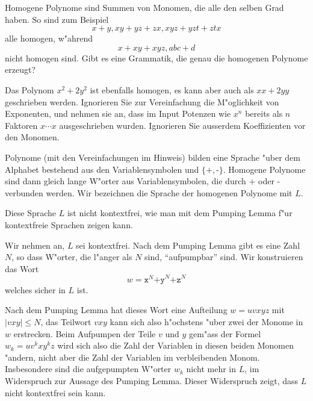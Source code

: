 Homogene Polynome sind Summen von Monomen, die alle den selben Grad haben.
So sind zum Beispiel 
\[
x+y, xy+yz+zx, xyz+yzt+ztx
\]
alle homogen, w"ahrend
\[
x+xy+xyz, abc+d
\]
nicht homogen sind. Gibt es eine Grammatik, die genau die homogenen Polynome
erzeugt?

\begin{hinweis}
Das Polynom $x^2+2y^2$ ist ebenfalls homogen, es kann aber auch als $xx+2yy$
geschrieben werden. 
Ignorieren Sie zur Vereinfachung die M"oglichkeit von Exponenten,
und nehmen sie an, dass im Input Potenzen wie $x^n$ bereits als
$n$ Faktoren $x\cdots x$ ausgeschrieben wurden.
Ignorieren Sie ausserdem Koeffizienten vor den Monomen.
\end{hinweis}

\begin{loesung}
Polynome (mit den Vereinfachungen im Hinweis) bilden eine Sprache
"uber dem Alphabet bestehend aus
den Variablensymbolen und $\{\texttt{+},\texttt{-}\}$.
Homogene Polynome sind
dann gleich lange W"orter aus Variablensymbolen, die durch
$\texttt{+}$ oder $\texttt{-}$ verbunden werden. Wir bezeichnen die
Sprache der homogenen Polynome mit $L$.

Diese Sprache $L$ ist nicht kontextfrei, wie man mit dem Pumping Lemma
f"ur kontextfreie Sprachen zeigen kann.

Wir nehmen an, $L$ sei kontextfrei. Nach dem Pumping Lemma
gibt es eine Zahl $N$, so dass W"orter, die l"anger als $N$ sind,
``aufpumpbar'' sind. Wir konstruieren das Wort
\[
w=\texttt{x}^N\texttt{+y}^N\texttt{+z}^N
\]
welches sicher in $L$ ist.

Nach dem Pumping Lemma hat dieses Wort eine Aufteilung
$w=uvxyz$ mit $|vxy|\le N$, das Teilwort $vxy$ kann sich also 
h"ochstens "uber zwei der Monome in $w$ erstrecken.
Beim Aufpumpen der Teile $v$ und $y$ gem"ass der Formel
$w_k=uv^kxy^kz$ wird sich also die Zahl der Variablen in diesen
beiden Monomen "andern, nicht aber die Zahl der Variablen im 
verbleibenden Monom. Insbesondere sind die aufgepumpten W"orter $w_k$
nicht mehr in $L$, im Widerspruch zur Aussage des Pumping Lemma.
Dieser Widerspruch zeigt, dass $L$ nicht kontextfrei sein kann.
\end{loesung}


